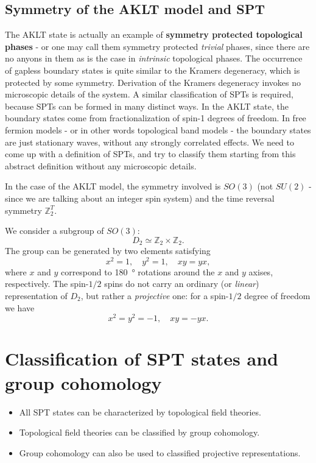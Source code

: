 \documentclass[hyperref, a4paper]{article}
\newcommand*{\concept}[1]{{\textbf{#1}}}
\begin{document}
\subsection{Symmetry of the AKLT model and SPT}

The AKLT state is actually an example of \concept{symmetry protected topological phases} - or one may call them symmetry protected \emph{trivial} phases, since there are no anyons in them as is the case in \emph{intrinsic} topological phases. 
The occurrence of gapless boundary states is quite similar to the Kramers degeneracy, which is protected by some symmetry.
Derivation of the Kramers degeneracy invokes no microscopic details of the system. 
A similar classification of SPTs is required, because SPTs can be formed in many distinct ways.
In the AKLT state, the boundary states come from fractionalization of spin-1 degrees of freedom.
In free fermion models - or in other words topological band models - the boundary states are just 
stationary waves, without any strongly correlated effects. We need to come up with a definition of SPTs, and try to classify them starting 
from this abstract definition without any microscopic details.

In the case of the AKLT model, the symmetry involved is $SO(3)$ (not $SU(2)$ - since we are talking about an integer spin system) and the time reversal symmetry $\mathbb{Z}_2^T$.

We consider a subgroup of $SO(3)$:
\begin{equation}
    D_2 \simeq \mathbb{Z}_2 \times \mathbb{Z}_2.
\end{equation}
The group can be generated by two elements satisfying
\begin{equation}
    x^2 = 1, \quad y^2 = 1, \quad xy = yx,
\end{equation}
where $x$ and $y$ correspond to \SI{180}{\degree} rotations around the $x$ and $y$ axises, respectively.
The spin-$1/2$ spins do not carry an ordinary (or \emph{linear}) representation of $D_2$, but rather a \emph{projective} one: for a spin-$1/2$ degree of freedom we have 
\begin{equation}
    x^2 = y^2 = -1, \quad xy = - yx.
\end{equation}

\section{Classification of SPT states and group cohomology}

\begin{itemize}
    \item All SPT states can be characterized by topological field theories.
    \item Topological field theories can be classified by group cohomology.
    \item Group cohomology can also be used to classified projective representations.
\end{itemize}
\end{document}
